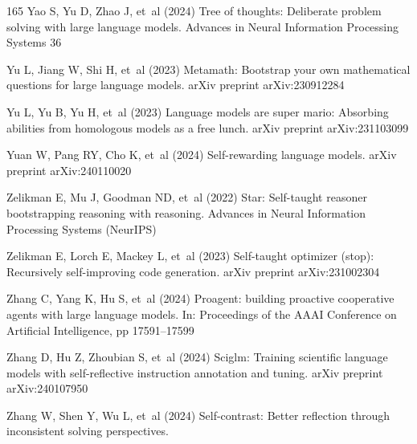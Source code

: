 \documentclass[sn-basic, Numbered]{sn-jnl}%
\theoremstyle{thmstyleone}%
\theoremstyle{thmstyletwo}%
\theoremstyle{thmstylethree}%
\begin{document}
\begin{thebibliography}{165}
Yao S, Yu D, Zhao J, et~al (2024) Tree of thoughts: Deliberate problem solving with large language models. Advances in Neural Information Processing Systems 36

Yu L, Jiang W, Shi H, et~al (2023{}) Metamath: Bootstrap your own mathematical questions for large language models. arXiv preprint arXiv:230912284

Yu L, Yu B, Yu H, et~al (2023{}) Language models are super mario: Absorbing abilities from homologous models as a free lunch. arXiv preprint arXiv:231103099

Yuan W, Pang RY, Cho K, et~al (2024) Self-rewarding language models. arXiv preprint arXiv:240110020

Zelikman E, Mu J, Goodman ND, et~al (2022) Star: Self-taught reasoner bootstrapping reasoning with reasoning. Advances in Neural Information Processing Systems (NeurIPS)

Zelikman E, Lorch E, Mackey L, et~al (2023) Self-taught optimizer (stop): Recursively self-improving code generation. arXiv preprint arXiv:231002304

Zhang C, Yang K, Hu S, et~al (2024{}) Proagent: building proactive cooperative agents with large language models. In: Proceedings of the AAAI Conference on Artificial Intelligence, pp 17591--17599

Zhang D, Hu Z, Zhoubian S, et~al (2024{}) Sciglm: Training scientific language models with self-reflective instruction annotation and tuning. arXiv preprint arXiv:240107950

Zhang W, Shen Y, Wu L, et~al (2024{}) Self-contrast: Better reflection through inconsistent solving perspectives. 


\end{thebibliography}
\end{document}
